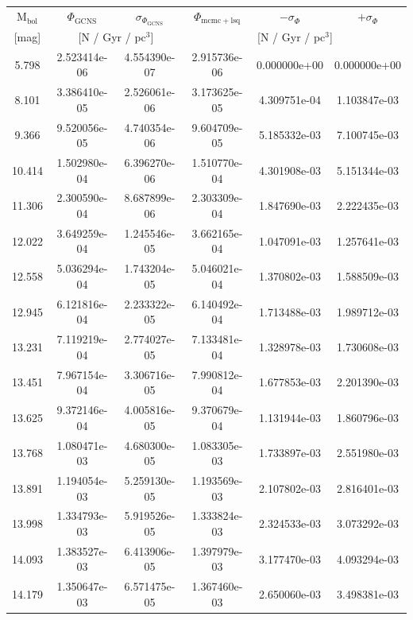 \documentclass[fleqn,usenatbib]{mnras}
\begin{document}
\begin{table}
    \centering
    \begin{tabular}{c|cc|ccc}
         M$_{\mathrm{bol}}$ & $\Phi_{\mathrm{GCNS}}$ & $\sigma_{\Phi_{\mathrm{GCNS}}}$ & $\Phi_{\mathrm{mcmc + lsq}}$ & $-\sigma_{\Phi}$ & $+\sigma_{\Phi}$ \\
         {[mag]} & \multicolumn{2}{c|}{[N / Gyr / pc$^3$]} & \multicolumn{3}{c}{[N / Gyr / pc$^3$]} \\\hline\hline
        5.798 & 2.523414e-06 & 4.554390e-07 & 2.915736e-06 & 0.000000e+00 & 0.000000e+00 \\ 
        8.101 & 3.386410e-05 & 2.526061e-06 & 3.173625e-05 & 4.309751e-04 & 1.103847e-03 \\ 
        9.366 & 9.520056e-05 & 4.740354e-06 & 9.604709e-05 & 5.185332e-03 & 7.100745e-03 \\ 
        10.414 & 1.502980e-04 & 6.396270e-06 & 1.510770e-04 & 4.301908e-03 & 5.151344e-03 \\ 
        11.306 & 2.300590e-04 & 8.687899e-06 & 2.303309e-04 & 1.847690e-03 & 2.222435e-03 \\ \hline
        12.022 & 3.649259e-04 & 1.245546e-05 & 3.662165e-04 & 1.047091e-03 & 1.257641e-03 \\ 
        12.558 & 5.036294e-04 & 1.743204e-05 & 5.046021e-04 & 1.370802e-03 & 1.588509e-03 \\ 
        12.945 & 6.121816e-04 & 2.233322e-05 & 6.140492e-04 & 1.713488e-03 & 1.989712e-03 \\ 
        13.231 & 7.119219e-04 & 2.774027e-05 & 7.133481e-04 & 1.328978e-03 & 1.730608e-03 \\ 
        13.451 & 7.967154e-04 & 3.306716e-05 & 7.990812e-04 & 1.677853e-03 & 2.201390e-03 \\ \hline
        13.625 & 9.372146e-04 & 4.005816e-05 & 9.370679e-04 & 1.131944e-03 & 1.860796e-03 \\ 
        13.768 & 1.080471e-03 & 4.680300e-05 & 1.083305e-03 & 1.733897e-03 & 2.551980e-03 \\ 
        13.891 & 1.194054e-03 & 5.259130e-05 & 1.193569e-03 & 2.107802e-03 & 2.816401e-03 \\ 
        13.998 & 1.334793e-03 & 5.919526e-05 & 1.333824e-03 & 2.324533e-03 & 3.073292e-03 \\ 
        14.093 & 1.383527e-03 & 6.413906e-05 & 1.397979e-03 & 3.177470e-03 & 4.093294e-03 \\ \hline
        14.179 & 1.350647e-03 & 6.571475e-05 & 1.367460e-03 & 2.650060e-03 & 3.498381e-03 \\ 

\end{tabular}
\end{table}
\end{document}
